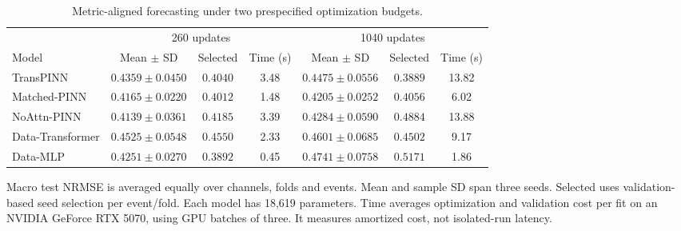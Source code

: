 \begin{table}[t]
\centering
\caption{Metric-aligned forecasting under two prespecified optimization budgets.}
\label{tab:aligned_budgets}
\footnotesize
\setlength{\tabcolsep}{4pt}
\renewcommand{\arraystretch}{1.08}
\begin{tabular*}{\textwidth}{@{\extracolsep{\fill}}lcccccc@{}}
\toprule
& \multicolumn{3}{c}{260 updates} & \multicolumn{3}{c}{1040 updates} \\
Model & Mean $\pm$ SD & Selected & Time (s) & Mean $\pm$ SD & Selected & Time (s) \\
\midrule
TransPINN & $0.4359\pm0.0450$ & $0.4040$ & 3.48 & $0.4475\pm0.0556$ & $0.3889$ & 13.82 \\
Matched-PINN & $0.4165\pm0.0220$ & $0.4012$ & 1.48 & $0.4205\pm0.0252$ & $0.4056$ & 6.02 \\
NoAttn-PINN & $0.4139\pm0.0361$ & $0.4185$ & 3.39 & $0.4284\pm0.0590$ & $0.4884$ & 13.88 \\
Data-Transformer & $0.4525\pm0.0548$ & $0.4550$ & 2.33 & $0.4601\pm0.0685$ & $0.4502$ & 9.17 \\
Data-MLP & $0.4251\pm0.0270$ & $0.3892$ & 0.45 & $0.4741\pm0.0758$ & $0.5171$ & 1.86 \\
\bottomrule
\end{tabular*}
\par\smallskip
\begin{minipage}{\textwidth}\footnotesize Macro test NRMSE is averaged equally over channels, folds and events. Mean and sample SD span three seeds. Selected uses validation-based seed selection per event/fold. Each model has 18,619 parameters. Time averages optimization and validation cost per fit on an NVIDIA GeForce RTX 5070, using GPU batches of three. It measures amortized cost, not isolated-run latency.\end{minipage}
\end{table}
